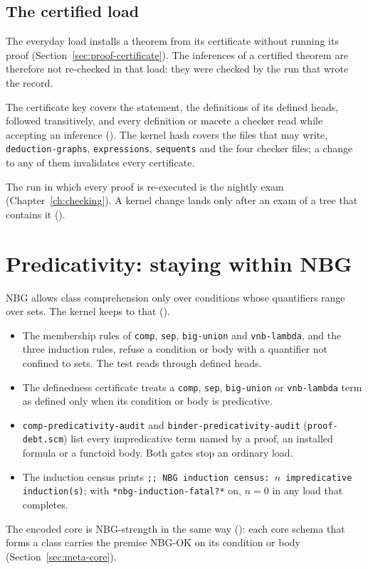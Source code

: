\subsection{The certified load}\label{sec:meta-certified}

The everyday load installs a theorem from its certificate without
running its proof (Section~\ref{sec:proof-certificate}).  The inferences
of a certified theorem are therefore not re-checked in that load: they
were checked by the run that wrote the record.

The certificate key covers the statement, the definitions of its defined
heads, followed transitively, and every definition or macete a checker
read while accepting an inference ().  The kernel hash covers the
files that may write, \texttt{deduction-graphs}, \texttt{expressions},
\texttt{sequents} and the four checker files; a change to any of them
invalidates every certificate.

The run in which every proof is re-executed is the nightly exam
(Chapter~\ref{ch:checking}).  A kernel change lands only after an exam of
a tree that contains it ().

\section{Predicativity: staying within NBG}\label{sec:meta-predicative}

NBG allows class comprehension only over conditions whose quantifiers
range over sets.  The kernel keeps to that ().
\begin{itemize}
\item The membership rules of \texttt{comp}, \texttt{sep},
  \texttt{big-union} and \texttt{vnb-lambda}, and the three induction
  rules, refuse a condition or body with a quantifier not confined to
  sets.  The test reads through defined heads.
\item The definedness certificate treats a \texttt{comp}, \texttt{sep},
  \texttt{big-union} or \texttt{vnb-lambda} term as defined only when its
  condition or body is predicative.
\item \texttt{comp-predicativity-audit} and
  \texttt{binder-predicativity-audit} (\texttt{proof-debt.scm}) list every
  impredicative term named by a proof, an installed formula or a functoid
  body.  Both gates stop an ordinary load.
\item The induction census prints
  \texttt{;; NBG induction census: $n$ impredicative induction(s)}; with
  \texttt{*nbg-induction-fatal?*} on, $n=0$ in any load that completes.
\end{itemize}
The encoded core is NBG-strength in the same way (): each core
schema that forms a class carries the premise $\mathrm{NBG\text{-}OK}$ on
its condition or body (Section~\ref{sec:meta-core}).
